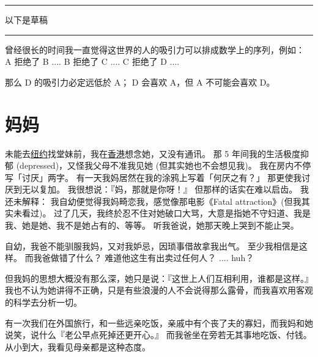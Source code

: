 \documentclass[12pt]{report}
\newcommand{\tab}{\hspace*{1cm}}
\newcommand*\todo{\begin{center}\color{red}  \rule{5cm}{0.5pt} 以下是草稿\, \rule{5cm}{0.5pt} \end{center}}
\begin{document}
\todo

曾经很长的时间我一直觉得这世界的人的吸引力可以排成数学上的序列，例如： \\
\tab \tab \tab A 拒绝了 B .... B 拒绝了 C .... C 拒绝了 D .... 
\begin{center}
\end{center}
那么 D 的吸引力必定远低於 A； D 会喜欢 A，但 A 不可能会喜欢 D。

\begin{center}
\end{center}

\chapter{妈妈}

未能去\uline{纽约}找堂妹前，我在\uline{香港}想念她，又没有通讯。 那 5 年间我的生活极度抑郁 (depressed)，又怪我父母不准我见她 (但其实她也不会想见我)。 我在房内不停写「讨厌」两字。 有一天我妈居然在我的涂鸦上写着「何厌之有？」 那更使我讨厌到无以复加。 我很想说：『妈，那就是你呀！』 但那样的话实在难以启齿。 我还未解释： 我自幼便觉得我妈畸恋我，感觉像那电影《Fatal attraction》(但我其实未看过)。 过了几天，我终於忍不住对她破口大骂，大意是指她不守妇道、我是我、她是她、我不是她占有的、等等。 听我爸说，她那天晚上哭到不能止哭。

自幼，我爸不能驯服我妈，又对我妒忌，因琐事借故拿我出气。 至少我相信是这样。 而我爸做错了什么？ 难道他这生有出卖过任何人？ .... huh？

但我妈的思想大概没有那么深，她只是说：『这世上人们互相利用，谁都是这样。』 我也不认为她讲得不正确，只是有些浪漫的人不会说得那么露骨，而我喜欢用客观的科学去分析一切。

有一次我们在外国旅行，和一些远亲吃饭，亲戚中有个丧了夫的寡妇，而我妈和她说笑，说什么『老公早点死掉还更开心。』 而我爸坐在旁若无其事地吃饭、付钱。 从小到大，我看见母亲都是这种态度。
\end{document}
